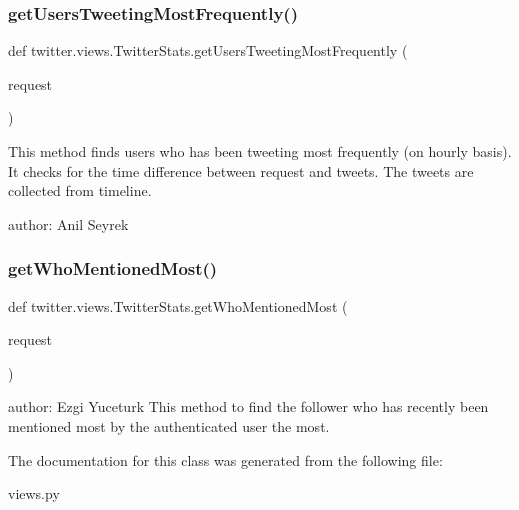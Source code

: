 \subsubsection{\texorpdfstring{get\+Users\+Tweeting\+Most\+Frequently()}{getUsersTweetingMostFrequently()}}
{\footnotesize\ttfamily def twitter.\+views.\+Twitter\+Stats.\+get\+Users\+Tweeting\+Most\+Frequently (\begin{DoxyParamCaption}\item[{}]{request }\end{DoxyParamCaption})}

\begin{DoxyVerb}This method finds users who has been tweeting most frequently (on hourly basis).
It checks for the time difference between request and tweets.
The tweets are collected from timeline.

author: Anil Seyrek
\end{DoxyVerb}
 \mbox{\label{classtwitter_1_1views_1_1_twitter_stats_a45827ee187a326fb1394d680bc483fb9}} 
\subsubsection{\texorpdfstring{get\+Who\+Mentioned\+Most()}{getWhoMentionedMost()}}
{\footnotesize\ttfamily def twitter.\+views.\+Twitter\+Stats.\+get\+Who\+Mentioned\+Most (\begin{DoxyParamCaption}\item[{}]{request }\end{DoxyParamCaption})}

\begin{DoxyVerb}author: Ezgi Yuceturk
This method to find the follower who has recently been mentioned most by the authenticated user the most.
\end{DoxyVerb}
 

The documentation for this class was generated from the following file\+:\begin{DoxyCompactItemize}
\item 
views.\+py\end{DoxyCompactItemize}
